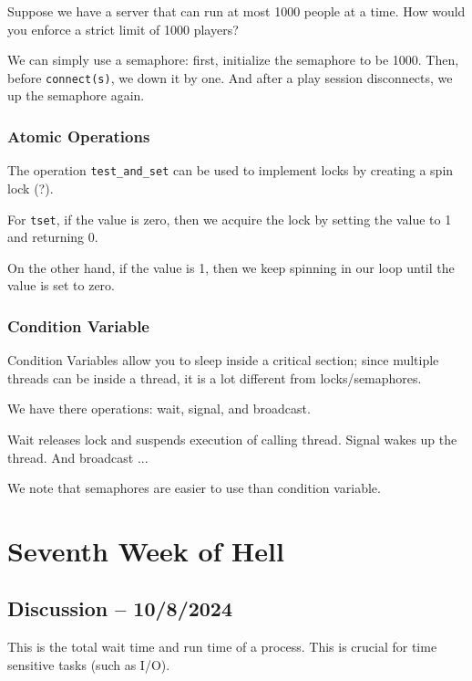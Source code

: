\documentclass[openany]{book}
\begin{document}
\begin{hw}
	Suppose we have a server that can run at most 1000 people at a time. How would you enforce a strict limit of 1000 players?
\end{hw}
\begin{solution}
	We can simply use a semaphore: first, initialize the semaphore to be 1000. Then, before \texttt{connect(s)}, we down it by one. And after a play session disconnects, we up the semaphore again. 
\end{solution}

\subsection{Atomic Operations}
The operation \texttt{test\_and\_set} can be used to implement locks by creating a spin lock (?).

For \texttt{tset}, if the value is zero, then we acquire the lock by setting the value to 1 and returning 0.

On the other hand, if the value is 1, then we keep spinning in our loop until the value is set to zero.

\subsection{Condition Variable}
Condition Variables allow you to sleep inside a critical section; since multiple threads can be inside a thread, it is a lot different from locks/semaphores.

We have there operations: wait, signal, and broadcast.

Wait releases lock and suspends execution of calling thread. Signal wakes up the thread. And broadcast ...

We note that semaphores are easier to use than condition variable.

\chapter{Seventh Week of Hell}
\section{Discussion -- 10/8/2024}
\begin{defn}
	This is the total wait time and run time of a process. This is crucial for time sensitive tasks (such as I/O).
\end{defn}
\end{document}
